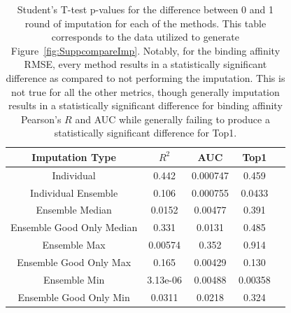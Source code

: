 \documentclass[journal=jcisd8,manuscript=article]{achemso}
\begin{document}
\begin{figure}[tbph]
    \label{fig:SuppmedGOEnsOverall}
\end{figure}

\begin{table}
    \centering
    \begin{tabular}{c|c|c|c|c}
    Imputation Type & $R^2$ & AUC & Top1 \\
    \hline
    Individual  & 0.442 & 0.000747 & 0.459 \\
    Individual  Ensemble & 0.106 & 0.000755 & 0.0433 \\
    Ensemble Median  & 0.0152 & 0.00477 & 0.391 \\
    Ensemble Good Only Median & 0.331 & 0.0131 & 0.485 \\
    Ensemble Max & 0.00574 & 0.352 & 0.914 \\
    Ensemble Good Only Max & 0.165 & 0.00429 & 0.130 \\
    Ensemble Min & 3.13e-06 & 0.00488 & 0.00358 \\
    Ensemble Good Only Min & 0.0311 & 0.0218 & 0.324 \\
    \end{tabular}
    \caption{Student's T-test p-values for the difference between 0 and 1 round of imputation for each of the methods. This table corresponds to the data utilized to generate Figure~\ref{fig:SuppcompareImp}. Notably, for the binding affinity RMSE, every method results in a statistically significant difference as compared to not performing the imputation. This is not true for all the other metrics, though generally imputation results in a statistically significant difference for binding affinity Pearson's $R$ and AUC while generally failing to produce a statistically significant difference for Top1.}
    \label{tab:SuppImpTypeSignificance}
\end{table}
\end{document}
